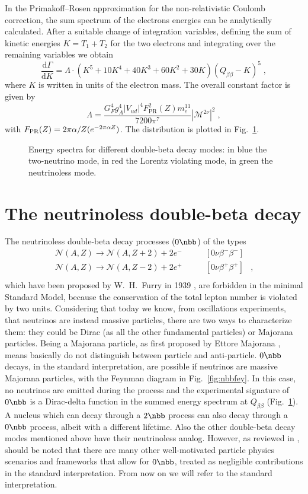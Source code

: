 In the Primakoff–Rosen approximation \cite{PrimakoffRosen} for the non-relativistic Coulomb correction, the sum spectrum of the electrons energies can be analytically calculated. After a suitable change of integration variables, defining the sum of kinetic energies $K=T_1+T_2$ for the two electrons and integrating over the remaining variables we obtain
\[\frac{\text{d}\Gamma}{\text{d}K}=\Lambda\cdot(K^5+10K^4+40K^3+60K^2+30K)(Q_{\beta\beta}-K)^5\;,\]\label{eq:spectstd}
where $K$ is written in units of the electron mass. The overall constant factor is given by
\[\Lambda=\frac{G_F^4g_A^4|V_{ud}|^4F^2_\text{PR}(Z)m_e^{11}}{7200\pi^7}|\mathcal{M}^{2\nu}|^2\;,\]
with $F_\text{PR}(Z)=2\pi\alpha/Z(\-e^{-2\pi\alpha Z})$. The distribution is plotted in Fig.~\ref{fig:energyspectra}.
\begin{figure}
	\centering
	\makebox[\textwidth]{}
	\caption{Energy spectra for different double-beta decay modes: in blue the two-neutrino mode, in red the Lorentz violating mode, in green the neutrinoless mode.}
	\label{fig:energyspectra}
\end{figure}

\section*{The neutrinoless double-beta decay}
The neutrinoless double-beta decay processes ($0\nbb$) of the types
\[
	\begin{array}{lrl}
		\mathcal{N}(A,Z)\longrightarrow \mathcal{N}(A,Z+2)+2e^- & \qquad [0\nu\beta^-\beta^-] & \\
		\mathcal{N}(A,Z)\longrightarrow \mathcal{N}(A,Z-2)+2e^+ & \qquad [0\nu\beta^+\beta^+] & , \\
	\end{array}
\]
which have been proposed by W.~H.~Furry in 1939 \cite{PhysRev.56.1184}, are forbidden in the minimal Standard Model, because the conservation of the total lepton number is violated by two units. Considering that today we know, from oscillations experiments, that neutrinos are instead massive particles, there are two ways to characterize them: they could be Dirac (as all the other fundamental particles) or Majorana particles. Being a Majorana particle, as first proposed by Ettore Majorana \cite{Majorana1932}, means basically do not distinguish between particle and anti-particle. $0\nbb$ decays, in the standard interpretation, are possible if neutrinos are massive Majorana particles, with the Feynman diagram in Fig.~\ref{fig:nbbfey}. In this case, no neutrinos are emitted during the process and the experimental signature of $0\nbb$ is a Dirac-delta function in the summed energy spectrum at $Q_{\beta\beta}$ (Fig.~\ref{fig:energyspectra}). A nucleus which can decay through a $2\nbb$ process can also decay through a $0\nbb$ process, albeit with a different lifetime. Also the other double-beta decay modes mentioned above have their neutrinoless analog. However, as reviewed in \cite{Rodejohann:2011mu}, should be noted that there are many other well-motivated particle physics scenarios and frameworks that allow for $0\nbb$, treated as negligible contributions in the standard interpretation. From now on we will refer to the standard interpretation.


